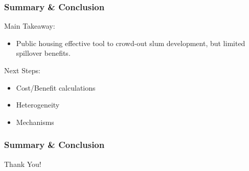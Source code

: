 \documentclass[aspectratio=32]{beamer}
\begin{document}

\begin{frame}
\frametitle{Summary \& Conclusion}

Main Takeaway:
\begin{itemize}
\item Public housing effective tool to crowd-out slum development, but limited spillover benefits.
 \end{itemize}
\vspace{2mm}
Next Steps:
  \begin{itemize}
    \item Cost/Benefit calculations 
    \item Heterogeneity 
    \item Mechanisms
  \end{itemize}


\end{frame}

\begin{frame}
\frametitle{Summary \& Conclusion}
{\Large
  \begin{center}
  Thank You!
  \end{center}
}
\end{frame}

\end{document}

